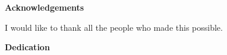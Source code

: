 
\begin{center}\textbf{Acknowledgements}\end{center}

I would like to thank all the people who made this possible.
\cleardoublepage


\begin{center}\textbf{Dedication}\end{center}


\cleardoublepage

\renewcommand\contentsname{Table of Contents}
\tableofcontents
\cleardoublepage
{}

\listoftables
\cleardoublepage
{}		%

\listoffigures
\cleardoublepage
{}		%



